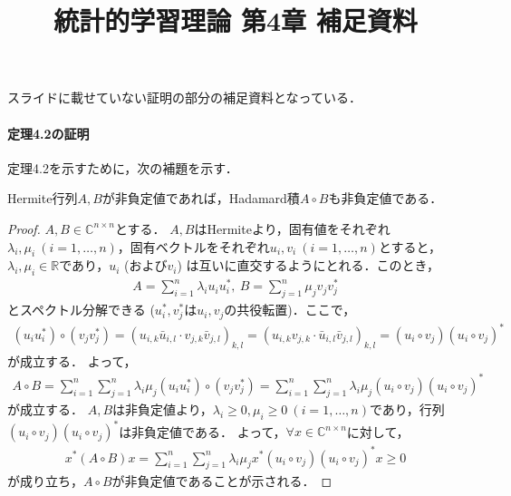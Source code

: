 \documentclass[dvipdfmx]{jsarticle}
\title{統計的学習理論 第4章 補足資料}
\author{}
\date{}
\begin{document}
\maketitle
スライドに載せていない証明の部分の補足資料となっている．

\paragraph{定理4.2の証明}
定理4.2を示すために，次の補題を示す．
\begin{lemm}\label{lemm:1}
  Hermite行列$A, B$が非負定値であれば，Hadamard積$A \circ B$も非負定値である．
\end{lemm}

\begin{proof}
  $A, B \in \mathbb{C}^{n \times n}$とする．
  $A, B$はHermiteより，固有値をそれぞれ$\lambda_i, \mu_i \ (i = 1, \ldots, n)$，固有ベクトルをそれぞれ$u_i, v_i \ (i = 1, \ldots, n)$とすると，$\lambda_i, \mu_i \in \mathbb{R}$であり，$u_i$ (および$v_i$) は互いに直交するようにとれる．このとき，
  \begin{align}
    A = \sum_{i = 1}^n \lambda_i u_i u_i^{*}, \ B = \sum_{j = 1}^n \mu_j v_j v_j^{*} \nonumber
  \end{align}
  とスペクトル分解できる ($u_i^{*}, v_j^{*}$は$u_i, v_j$の共役転置)．ここで，
  \begin{align}
    (u_i u_i^{*}) \circ (v_j v_j^{*}) = (u_{i,k} \bar{u}_{i, l} \cdot v_{j,k} \bar{v}_{j,l})_{k,l} = (u_{i,k}v_{j,k} \cdot \bar{u}_{i,l}\bar{v}_{j,l})_{k, l}
    = (u_i \circ v_j) (u_i \circ v_j)^{*} \nonumber
  \end{align}
  が成立する．
  よって，
  \begin{align}
    A \circ B = \sum_{i = 1}^n \sum_{j = 1}^n \lambda_i \mu_j (u_i u_i^{*}) \circ (v_j v_j^{*})
    = \sum_{i = 1}^n \sum_{j = 1}^n \lambda_i \mu_j (u_i \circ v_j) (u_i \circ v_j)^{*} \nonumber
  \end{align}
  が成立する．
  $A, B$は非負定値より，$\lambda_i \geq 0, \mu_i \geq 0 \ (i = 1, \ldots, n)$であり，行列$(u_i \circ v_j) (u_i \circ v_j)^{*}$は非負定値である．
  よって，$\forall x \in \mathbb{C}^{n \times n}$に対して，
  \begin{align}
    x^{*} (A \circ B) x = \sum_{i = 1}^n \sum_{j = 1}^n \lambda_i \mu_j x^{*} (u_i \circ v_j) (u_i \circ v_j)^{*}  x \geq 0 \nonumber
  \end{align}
  が成り立ち，$A \circ B$が非負定値であることが示される．
\end{proof}
\end{document}
